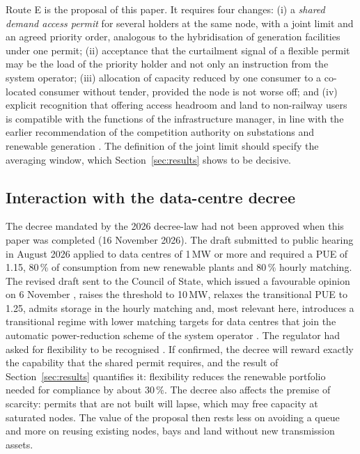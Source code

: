 Route E is the proposal of this paper. It requires four changes: (i) a \emph{shared demand access permit} for several holders at the same node, with a joint limit and an agreed priority order, analogous to the hybridisation of generation facilities under one permit; (ii) acceptance that the curtailment signal of a flexible permit may be the load of the priority holder and not only an instruction from the system operator; (iii) allocation of capacity reduced by one consumer to a co-located consumer without tender, provided the node is not worse off; and (iv) explicit recognition that offering access headroom and land to non-railway users is compatible with the functions of the infrastructure manager, in line with the earlier recommendation of the competition authority on substations and renewable generation \cite{cnmc2023adif}. The definition of the joint limit should specify the averaging window, which Section~\ref{sec:results} shows to be decisive.

\subsection{Interaction with the data-centre decree}

The decree mandated by the 2026 decree-law had not been approved when this paper was completed (16 November 2026). The draft submitted to public hearing in August 2026 \cite{prd2026} applied to data centres of 1\,MW or more and required a PUE of 1.15, 80\,\% of consumption from new renewable plants and 80\,\% hourly matching. The revised draft sent to the Council of State, which issued a favourable opinion on 6 November \cite{mundiario2026}, raises the threshold to 10\,MW, relaxes the transitional PUE to 1.25, admits storage in the hourly matching and, most relevant here, introduces a transitional regime with lower matching targets for data centres that join the automatic power-reduction scheme of the system operator \cite{ashurst2026}. The regulator had asked for flexibility to be recognised \cite{cnmc2026ipn}. If confirmed, the decree will reward exactly the capability that the shared permit requires, and the result of Section~\ref{sec:results} quantifies it: flexibility reduces the renewable portfolio needed for compliance by about 30\,\%. The decree also affects the premise of scarcity: permits that are not built will lapse, which may free capacity at saturated nodes. The value of the proposal then rests less on avoiding a queue and more on reusing existing nodes, bays and land without new transmission assets.

